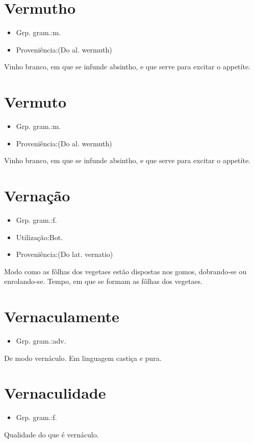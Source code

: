 \documentclass{article}
\begin{document}
\section{Vermutho}
\begin{itemize}
\item {Grp. gram.:m.}
\end{itemize}
\begin{itemize}
\item {Proveniência:(Do al. \textunderscore wermuth\textunderscore )}
\end{itemize}
Vinho branco, em que se infunde absintho, e que serve para excitar o appetíte.
\section{Vermuto}
\begin{itemize}
\item {Grp. gram.:m.}
\end{itemize}
\begin{itemize}
\item {Proveniência:(Do al. \textunderscore wermuth\textunderscore )}
\end{itemize}
Vinho branco, em que se infunde absintho, e que serve para excitar o appetíte.
\section{Vernação}
\begin{itemize}
\item {Grp. gram.:f.}
\end{itemize}
\begin{itemize}
\item {Utilização:Bot.}
\end{itemize}
\begin{itemize}
\item {Proveniência:(Do lat. \textunderscore vernatio\textunderscore )}
\end{itemize}
Modo como as fôlhas dos vegetaes estão dispostas nos gomos, dobrando-se ou enrolando-se.
Tempo, em que se formam as fôlhas dos vegetaes.
\section{Vernaculamente}
\begin{itemize}
\item {Grp. gram.:adv.}
\end{itemize}
De modo vernáculo.
Em linguagem castiça e pura.
\section{Vernaculidade}
\begin{itemize}
\item {Grp. gram.:f.}
\end{itemize}
Qualidade do que é vernáculo.
\end{document}
